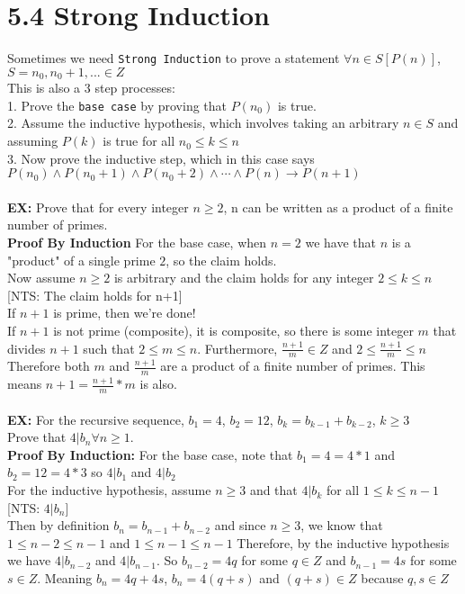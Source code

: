 \documentclass{article}
\begin{document}
		\section[03/27/18]{5.4 Strong Induction}
		Sometimes we need \texttt{Strong Induction} to prove a statement $\forall n\in S[P(n)]$, $S={n_0,n_0+1,...} \in Z$\\
		This is also a 3 step processes:\\
		1. Prove the \texttt{base case} by proving that $P(n_0)$ is true.\\
		2. Assume the inductive hypothesis, which involves taking an arbitrary $n\in S$ and assuming $P(k)$ is true for all $n_0\leq k\leq n$ \\
		3. Now prove the inductive step, which in this case says $P(n_0)\land P(n_0+1)\land P(n_0+2)\land \cdots \land P(n) \rightarrow P(n+1)$
		\\ \\
		\textbf{EX:} Prove that for every integer $n\geq 2$, n can be written as a product of a finite number of primes. \\
		\textbf{Proof By Induction} For the base case, when $n=2$ we have that $n$ is a "product" of a single prime $2$, so the claim holds. \\
		Now assume $n\geq 2$ is arbitrary and the claim holds for any integer $2\leq k\leq n$ [NTS: The claim holds for n+1] \\
		If $n+1$ is prime, then we're done! \\
		If $n+1$ is not prime (composite), it is composite, so there is some integer $m$ that divides $n+1$ such that $2\leq m\leq n$. Furthermore, $\frac{n+1}{m} \in Z$ and $2\leq \frac{n+1}{m} \leq n$ Therefore both $m$ and $\frac{n+1}{m}$ are a product of a finite number of primes. This means $n+1=\frac{n+1}{m}*m$ is also. \\
		\\
		\textbf{EX:} For the recursive sequence, $b_1=4$, $b_2=12$, $b_k=b_{k-1}+b_{k-2}$, $k\geq 3$ \\
		Prove that $4|b_n \forall n\geq 1$.\\
		\textbf{Proof By Induction:} For the base case, note that $b_1=4=4*1$ and $b_2=12=4*3$ so $4|b_1$ and $4|b_2$\\
		For the inductive hypothesis, assume $n\geq 3$ and that $4|b_k$ for all $1\leq k\leq n-1$ [NTS: $4|b_n$]\\
		Then by definition $b_n=b_{n-1}+b_{n-2}$ and since $n\geq 3$, we know that $1\leq n-2\leq n-1$ and $1\leq n-1\leq n-1$ Therefore, by the inductive hypothesis we have $4|b_{n-2}$ and $4|b_{n-1}$. So $b_{n-2}=4q$ for some $q\in Z$ and $b_{n-1}=4s$ for some $s\in Z$. Meaning $b_n=4q+4s$, $b_n=4(q+s)$ and $(q+s)\in Z$ because $q,s\in Z$\\
\end{document}
